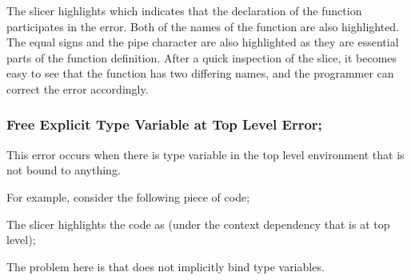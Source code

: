 \documentclass{article}
\begin{document}
\begin{itemize}

The slicer highlights  which indicates that the
declaration of the function participates in the error. Both of the
names of the function are also highlighted. The equal signs and the
pipe character are also highlighted as they are essential parts of the
function definition. After a quick inspection of the slice, it becomes
easy to see that the function has two differing names, and the
programmer can correct the error accordingly.




\newpage


\subsubsection{Free Explicit Type Variable at Top Level Error;}

\subitem This error occurs when there is type variable in the top
level environment that is not bound to anything.


For example, consider the following piece of code;


The slicer highlights the code as (under the context dependency that
 is at top level);


The problem here is that  does not implicitly
bind type variables.


\vspace{0.5in}


\end{itemize}
\end{document}
